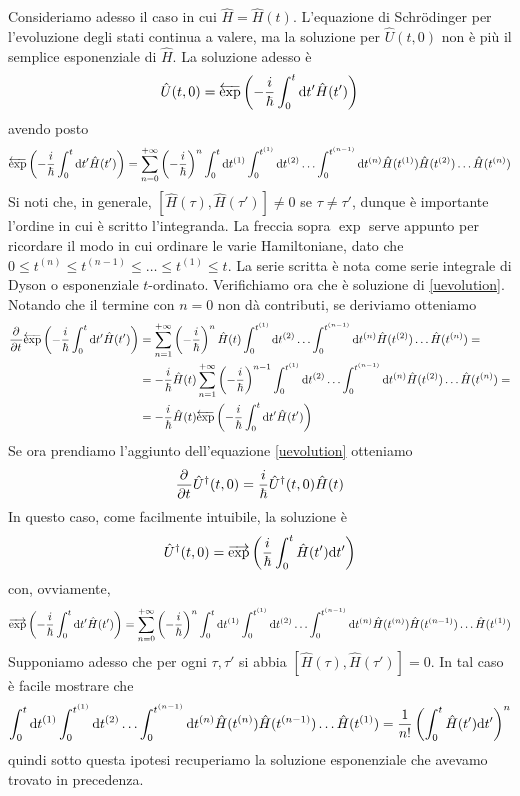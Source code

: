 \documentclass[a4paper, 11pt]{article}
\newcommand{\ham}{\hat{H}}
\renewcommand{\U}{\hat{U}}
\begin{document}
Consideriamo adesso il caso in cui $\ham=\ham(t)$. L'equazione di Schr\"odinger per l'evoluzione degli stati continua a valere, ma la soluzione per $\U(t,0)$ non è più il semplice esponenziale di $\ham$. La soluzione adesso è
\[\U(t,0)=\overleftarrow{\exp}\left(-\frac{i}{\hbar}\int_0^{t}\d t'\ham(t')\right)\]
avendo posto
\[\overleftarrow{\exp}\left(-\frac{i}{\hbar}\int_0^{t}\d t'\ham(t')\right)=\sum_{n=0}^{+\infty}\left(-\frac{i}{\hbar}\right)^n\int_0^{t}\d t^{(1)}\int_0^{t^{(1)}}\d t^{(2)}\ldots\int_0^{t^{(n-1)}}\d t^{(n)}\ham(t^{(1)})\ham(t^{(2)})\ldots\ham(t^{(n)})\]
Si noti che, in generale, $[\ham(\tau),\ham(\tau')]\neq0$ se $\tau\neq\tau'$, dunque è importante l'ordine in cui è scritto l'integranda. La freccia sopra $\exp$ serve appunto per ricordare il modo in cui ordinare le varie Hamiltoniane, dato che $0\leq t^{(n)}\leq t^{(n-1)}\leq\dots\leq t^{(1)}\leq t$. La serie scritta è nota come serie integrale di Dyson o esponenziale $t$-ordinato. Verifichiamo ora che è soluzione di \ref{uevolution}. Notando che il termine con $n=0$ non dà contributi, se deriviamo otteniamo
\begin{align*}
	\pder{}{t}\overleftarrow{\exp}\left(-\frac{i}{\hbar}\int_0^{t}\d t'\ham(t')\right)&=\sum_{n=1}^{+\infty}\left(-\frac{i}{\hbar}\right)^n\ham(t)\int_0^{t^{(1)}}\d t^{(2)}\ldots\int_0^{t^{(n-1)}}\d t^{(n)}\ham(t^{(2)})\ldots\ham(t^{(n)})=\\&=-\frac{i}{\hbar}\ham(t)\sum_{n=1}^{+\infty}\left(-\frac{i}{\hbar}\right)^{n-1}\int_0^{t^{(1)}}\d t^{(2)}\ldots\int_0^{t^{(n-1)}}\d t^{(n)}\ham(t^{(2)})\ldots\ham(t^{(n)})=\\&=-\frac{i}{\hbar}\ham(t)\overleftarrow{\exp}\left(-\frac{i}{\hbar}\int_0^{t}\d t'\ham(t')\right)
\end{align*}
Se ora prendiamo l'aggiunto dell'equazione \ref{uevolution} otteniamo
\[\pder{}{t}\U^\dagger(t,0)=\frac{i}{\hbar}\U^\dagger(t,0)\ham(t)\]
In questo caso, come facilmente intuibile, la soluzione è
\[\U^\dagger(t,0)=\overrightarrow{\exp}\left(\frac{i}{\hbar}\int_0^t\ham(t')\d t'\right)\]
con, ovviamente, 
\[\overrightarrow{\exp}\left(-\frac{i}{\hbar}\int_0^{t}\d t'\ham(t')\right)=\sum_{n=0}^{+\infty}\left(-\frac{i}{\hbar}\right)^n\int_0^{t}\d t^{(1)}\int_0^{t^{(1)}}\d t^{(2)}\ldots\int_0^{t^{(n-1)}}\d t^{(n)}\ham(t^{(n)})\ham(t^{(n-1)})\ldots\ham(t^{(1)})\]
Supponiamo adesso che per ogni $\tau,\tau'$ si abbia $[\ham(\tau),\ham(\tau')]=0$. In tal caso è facile mostrare che
\[\int_0^{t}\d t^{(1)}\int_0^{t^{(1)}}\d t^{(2)}\ldots\int_0^{t^{(n-1)}}\d t^{(n)}\ham(t^{(n)})\ham(t^{(n-1)})\ldots\ham(t^{(1)})=\frac{1}{n!}\left(\int_0^t\ham(t')\d t'\right)^n\]
quindi sotto questa ipotesi recuperiamo la soluzione esponenziale che avevamo trovato in precedenza.
\end{document}
